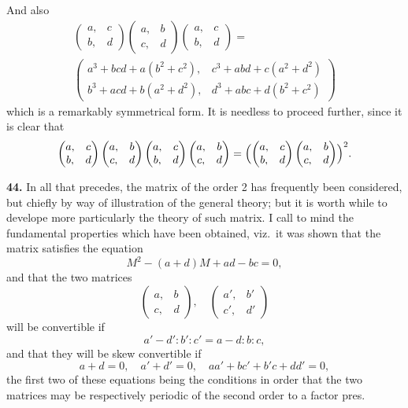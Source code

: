 \documentclass[12pt,a4paper]{article}
\theoremstyle{definition}
\begin{document}
And also
\begin{multline*}
\begin{pmatrix} a, & c \\ b, & d \end{pmatrix}
\begin{pmatrix} a, & b \\ c, & d \end{pmatrix}
\begin{pmatrix} a, & c \\ b, & d \end{pmatrix} = \\
\begin{pmatrix}
a^3+bcd+a(b^2+c^2), & c^3+abd+c(a^2+d^2) \\
b^3+acd+b(a^2+d^2), & d^3+abc+d(b^2+c^2)
\end{pmatrix}
\end{multline*}
which is a remarkably symmetrical form. It is needless to proceed further, since it is clear that
\[
\begin{pmatrix} a, & c \\ b, & d \end{pmatrix}
\begin{pmatrix} a, & b \\ c, & d \end{pmatrix}
\begin{pmatrix} a, & c \\ b, & d \end{pmatrix}
\begin{pmatrix} a, & b \\ c, & d \end{pmatrix}
=\Bigl(
\begin{pmatrix} a, & c \\ b, & d \end{pmatrix}
\begin{pmatrix} a, & b \\ c, & d \end{pmatrix}
\Bigr)^2.
\]

\newpage

\medskip
\noindent\textbf{44.} In all that precedes, the matrix of the order 2 has frequently been considered, but chiefly by way of illustration of the general theory; but it is worth while to develope more particularly the theory of such matrix. I call to mind the fundamental properties which have been obtained, viz.\ it was shown that the matrix satisfies the equation
\[
M^2 - (a+d)M + ad - bc = 0,
\]
and that the two matrices
\[
\begin{pmatrix} a, & b \\ c, & d \end{pmatrix},\quad
\begin{pmatrix} a', & b' \\ c', & d' \end{pmatrix}
\]
will be convertible if
\[a'-d' : b' : c' = a-d : b : c,\]
and that they will be skew convertible if
\[
a+d=0,\quad a'+d'=0,\quad aa'+bc'+b'c+dd'=0,
\]
the first two of these equations being the conditions in order that the two matrices may be respectively periodic of the second order to a factor pres.
\end{document}

